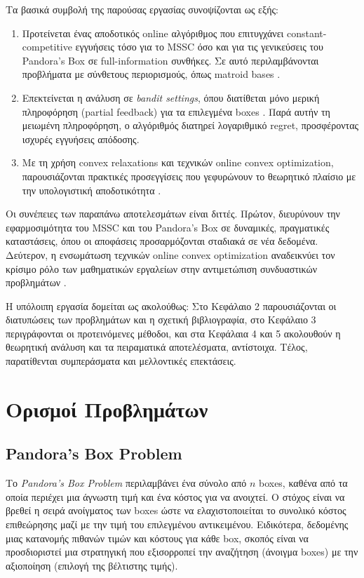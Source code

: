 \documentclass[11pt,a4paper]{article}
\begin{document}
Τα βασικά συμβολή της παρούσας εργασίας συνοψίζονται ως εξής:
\begin{enumerate}
    \item Προτείνεται ένας αποδοτικός online αλγόριθμος που επιτυγχάνει constant-competitive εγγυήσεις τόσο για το MSSC όσο και για τις γενικεύσεις του Pandora's Box σε full-information συνθήκες. Σε αυτό περιλαμβάνονται προβλήματα με σύνθετους περιορισμούς, όπως matroid bases \cite{bansal2010constant}.
    \item Επεκτείνεται η ανάλυση σε \textit{bandit settings}, όπου διατίθεται μόνο μερική πληροφόρηση (partial feedback) για τα επιλεγμένα boxes \cite{flaxman2004online}. Παρά αυτήν τη μειωμένη πληροφόρηση, ο αλγόριθμός διατηρεί λογαριθμικό regret, προσφέροντας ισχυρές εγγυήσεις απόδοσης.
    \item Με τη χρήση convex relaxations και τεχνικών online convex optimization, παρουσιάζονται πρακτικές προσεγγίσεις που γεφυρώνουν το θεωρητικό πλαίσιο με την υπολογιστική αποδοτικότητα \cite{shalev2007primal}.
\end{enumerate}

Οι συνέπειες των παραπάνω αποτελεσμάτων είναι διττές. Πρώτον, διευρύνουν την εφαρμοσιμότητα του MSSC και του Pandora's Box σε δυναμικές, πραγματικές καταστάσεις, όπου οι αποφάσεις προσαρμόζονται σταδιακά σε νέα δεδομένα. Δεύτερον, η ενσωμάτωση τεχνικών online convex optimization αναδεικνύει τον κρίσιμο ρόλο των μαθηματικών εργαλείων στην αντιμετώπιση συνδυαστικών προβλημάτων \cite{gergatsouli2022online}.

Η υπόλοιπη εργασία δομείται ως ακολούθως: Στο Κεφάλαιο 2 παρουσιάζονται οι διατυπώσεις των προβλημάτων και η σχετική βιβλιογραφία, στο Κεφάλαιο 3 περιγράφονται οι προτεινόμενες μέθοδοι, και στα Κεφάλαια 4 και 5 ακολουθούν η θεωρητική ανάλυση και τα πειραματικά αποτελέσματα, αντίστοιχα. Τέλος, παρατίθενται συμπεράσματα και μελλοντικές επεκτάσεις.

\section{Ορισμοί Προβλημάτων}
\subsection{Pandora’s Box Problem}
Το \textit{Pandora’s Box Problem} περιλαμβάνει ένα σύνολο από \( n \) boxes, καθένα από τα οποία περιέχει μια άγνωστη τιμή και ένα κόστος για να ανοιχτεί. Ο στόχος είναι να βρεθεί η σειρά ανοίγματος των boxes ώστε να ελαχιστοποιείται το συνολικό κόστος επιθεώρησης μαζί με την τιμή του επιλεγμένου αντικειμένου. Ειδικότερα, δεδομένης μιας κατανομής πιθανών τιμών και κόστους για κάθε box, σκοπός είναι να προσδιοριστεί μια στρατηγική που εξισορροπεί την αναζήτηση (άνοιγμα boxes) με την αξιοποίηση (επιλογή της βέλτιστης τιμής).
\end{document}
